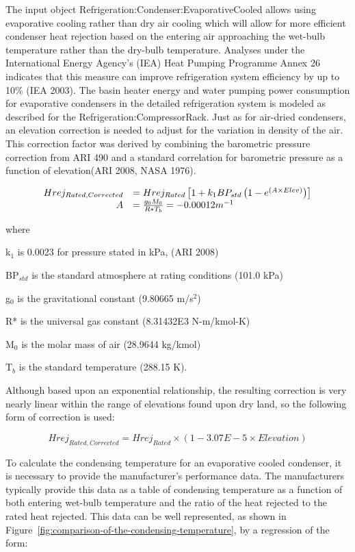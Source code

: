 The input object Refrigeration:Condenser:EvaporativeCooled allows using evaporative cooling rather than dry air cooling which will allow for more efficient condenser heat rejection based on the entering air approaching the wet-bulb temperature rather than the dry-bulb temperature. Analyses under the International Energy Agency's (IEA) Heat Pumping Programme Annex 26 indicates that this measure can improve refrigeration system efficiency by up to 10\% (IEA 2003). The basin heater energy and water pumping power consumption for evaporative condensers in the detailed refrigeration system is modeled as described for the Refrigeration:CompressorRack. Just as for air-dried condensers, an elevation correction is needed to adjust for the variation in density of the air. This correction factor was derived by combining the barometric pressure correction from ARI 490 and a standard correlation for barometric pressure as a function of elevation(ARI 2008, NASA 1976).

\begin{equation}
  \begin{array}{rl}
    Hrej_{Rated,Corrected} &= Hrej_{Rated} \left[ 1 + k_1 B P_{std} \left(1 - e^{\left(A \times Elev\right)}\right)\right] \\
    A &= \frac{g_0 M_0}{R* T_b} = - 0.00012m^{-1}
  \end{array}
\end{equation}

where

k\(_{1}\) is 0.0023 for pressure stated in kPa, (ARI 2008)

BP\(_{std}\) is the standard atmosphere at rating conditions (101.0 kPa)

g\(_{0}\) is the gravitational constant (9.80665 m/s\(^{2}\))

R* is the universal gas constant (8.31432E3 N-m/kmol-K)

M\(_{0}\) is the molar mass of air (28.9644 kg/kmol)

T\(_{b}\) is the standard temperature (288.15 K).

Although based upon an exponential relationship, the resulting correction is very nearly linear within the range of elevations found upon dry land, so the following form of correction is used:

\begin{equation}
Hre{j_{Rated,Corrected}} = Hre{j_{Rated}} \times (1 - 3.07E - 5 \times Elevation)
\end{equation}

To calculate the condensing temperature for an evaporative cooled condenser, it is necessary to provide the manufacturer's performance data. The manufacturers typically provide this data as a table of condensing temperature as a function of both entering wet-bulb temperature and the ratio of the heat rejected to the rated heat rejected. This data can be well represented, as shown in Figure~\ref{fig:comparison-of-the-condensing-temperature}, by a regression of the form:

